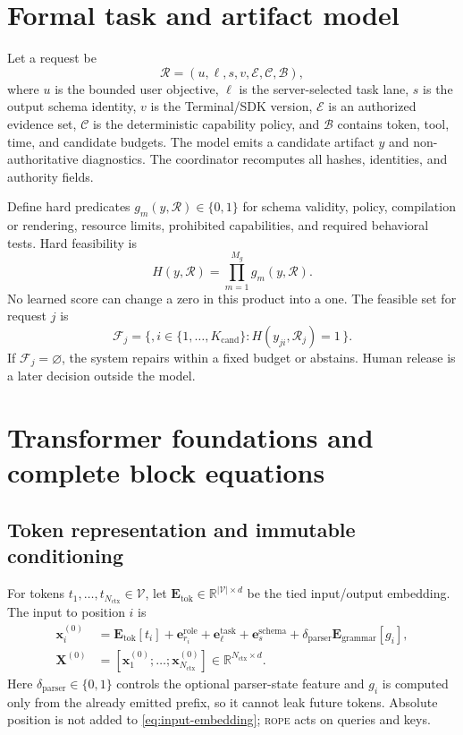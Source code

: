 \documentclass[10pt,letterpaper]{article}
\newcommand{\abbr}[1]{\textsc{\MakeLowercase{#1}}}
\newcommand{\R}{\mathbb{R}}
\newcommand{\1}{\mathbb{1}}
\newcommand{\vect}[1]{\bm{#1}}
\newcommand{\mat}[1]{\bm{#1}}
\begin{document}
\section{Formal task and artifact model}

Let a request be
\begin{equation}
  \mathcal R = (u,\ell,s,v,\mathcal E,\mathcal C,\mathcal B),
  \label{eq:request}
\end{equation}
where $u$ is the bounded user objective, $\ell$ is the server-selected task lane, $s$ is the output
schema identity, $v$ is the Terminal/SDK version, $\mathcal E$ is an authorized evidence set,
$\mathcal C$ is the deterministic capability policy, and $\mathcal B$ contains token, tool, time,
and candidate budgets.  The model emits a candidate artifact $y$ and non-authoritative diagnostics.
The coordinator recomputes all hashes, identities, and authority fields.

Define hard predicates $g_m(y,\mathcal R)\in\{0,1\}$ for schema validity, policy, compilation or
rendering, resource limits, prohibited capabilities, and required behavioral tests.  Hard feasibility
is
\begin{equation}
  H(y,\mathcal R)=\prod_{m=1}^{M_g} g_m(y,\mathcal R).
  \label{eq:hard-feasible}
\end{equation}
No learned score can change a zero in this product into a one.  The feasible set for request $j$ is
\begin{equation}
  \mathcal F_j=\{,i\in\{1,\ldots,K_{\mathrm{cand}}\}:H(y_{ji},\mathcal R_j)=1\,\}.
  \label{eq:feasible-set}
\end{equation}
If $\mathcal F_j=\varnothing$, the system repairs within a fixed budget or abstains.  Human release
is a later decision outside the model.

\section{Transformer foundations and complete block equations}

\subsection{Token representation and immutable conditioning}

For tokens $t_1,\ldots,t_{N_{\mathrm{ctx}}}\in\mathcal V$, let
$\mat E_{\mathrm{tok}}\in\R^{|\mathcal V|\times d}$ be the tied input/output embedding.  The input
to position $i$ is
\begin{align}
  \vect x_i^{(0)}
  &= \mat E_{\mathrm{tok}}[t_i]
   + \vect e^{\mathrm{role}}_{r_i}
   + \vect e^{\mathrm{task}}_{\ell}
   + \vect e^{\mathrm{schema}}_{s}
   + \delta_{\mathrm{parser}}\mat E_{\mathrm{grammar}}[g_i],
  \label{eq:input-embedding}\\
  \mat X^{(0)}
  &= [\vect x_1^{(0)};\ldots;\vect x_{N_{\mathrm{ctx}}}^{(0)}]
  \in\R^{N_{\mathrm{ctx}}\times d}.
\end{align}
Here $\delta_{\mathrm{parser}}\in\{0,1\}$ controls the optional parser-state feature and
$g_i$ is computed only from the already emitted prefix, so it cannot leak future tokens.  Absolute
position is not added to \cref{eq:input-embedding}; \abbr{RoPE} acts on queries and keys.
\end{document}
